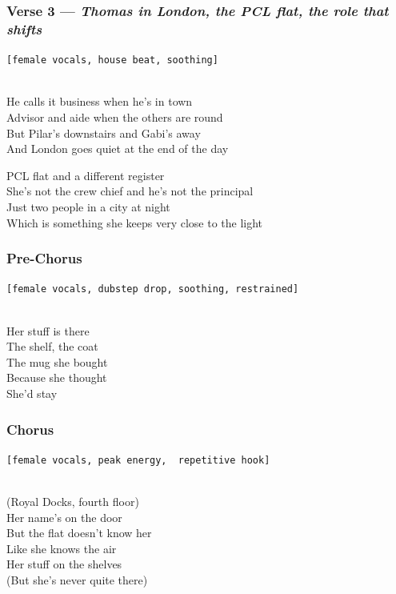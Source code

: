\documentclass[]{article}
\begin{document}
\subsubsection{\texorpdfstring{Verse 3 --- \emph{Thomas in London, the
PCL flat, the role that
shifts}}{Verse 3 --- Thomas in London, the PCL flat, the role that shifts}}\label{verse-3-thomas-in-london-the-pcl-flat-the-role-that-shifts}

\texttt{{[}female\ vocals,\ house\ beat,\ soothing{]}}\strut \\
He calls it business when he's in town\\
Advisor and aide when the others are round\\
But Pilar's downstairs and Gabi's away\\
And London goes quiet at the end of the day

PCL flat and a different register\\
She's not the crew chief and he's not the principal\\
Just two people in a city at night\\
Which is something she keeps very close to the light

\subsubsection{Pre-Chorus}\label{pre-chorus-56}

\texttt{{[}female\ vocals,\ dubstep\ drop,\ soothing,\ restrained{]}}\strut \\
Her stuff is there\\
The shelf, the coat\\
The mug she bought\\
Because she thought\\
She'd stay

\subsubsection{Chorus}\label{chorus-84}

\texttt{{[}female\ vocals,\ peak\ energy,\ \ repetitive\ hook{]}}\strut \\
(Royal Docks, fourth floor)\\
Her name's on the door\\
But the flat doesn't know her\\
Like she knows the air\\
Her stuff on the shelves\\
(But she's never quite there)
\end{document}
